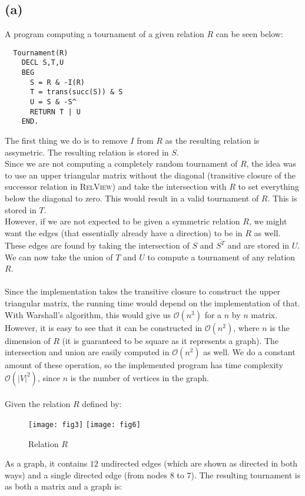 \documentclass[a4paper, fleqn]{article}
\begin{document}
\subsection{(a)}
A program computing a tournament of a given relation $R$ can be seen below:
\begin{verbatim}
  Tournament(R)
    DECL S,T,U
    BEG
      S = R & -I(R)
      T = trans(succ(S)) & S
      U = S & -S^
      RETURN T | U
    END.
\end{verbatim}
The first thing we do is to remove $I$ from $R$ as the resulting relation is assymetric.
The resulting relation is stored in $S$. \\
Since we are not computing a completely random tournament of $R$, the idea was to use an
upper triangular matrix without the diagonal (transitive closure of the successor
relation in \textsc{RelView}) and take the intersection with $R$ to set everything below
the diagonal to zero. This would result in a valid tournament of $R$. This is stored in
$T$. \\
However, if we are not expected to be given a symmetric relation $R$, we might want the
edges (that essentially already have a direction) to be in $R$ as well. These edges are
found by taking the intersection of $S$ and $\overline{S^T}$ and are stored in $U$. We
can now take the union of $T$ and $U$ to compute a tournament of any relation $R$. \\
\\
Since the implementation takes the transitive closure to construct the upper triangular
matrix, the running time would depend on the implementation of that. With Warshall's
algorithm, this would give us $\mathcal{O}(n^3)$ for a $n$ by $n$ matrix. However, it is
easy to see that it can be constructed in $\mathcal{O}(n^2)$, where $n$ is the dimension
of $R$ (it is guaranteed to be square as it represents a graph). The intersection and
union are easily computed in $\mathcal{O}(n^2)$ as well. We do a constant amount of these
operation, so the implemented program has time complexity $\mathcal{O}(|V|^2)$, since $n$
is the number of vertices in the graph.\\
\\
Given the relation $R$ defined by:
\begin{figure}[H]
  \centering
  \texttt{[image: fig3]}
  \texttt{[image: fig6]}
  \caption{Relation $R$}
\end{figure}
As a graph, it contains $12$ undirected edges (which are shown as directed in both ways) and
a single directed edge (from nodes $8$ to $7$). The resulting tournament is as both a matrix and a graph is:
\end{document}
